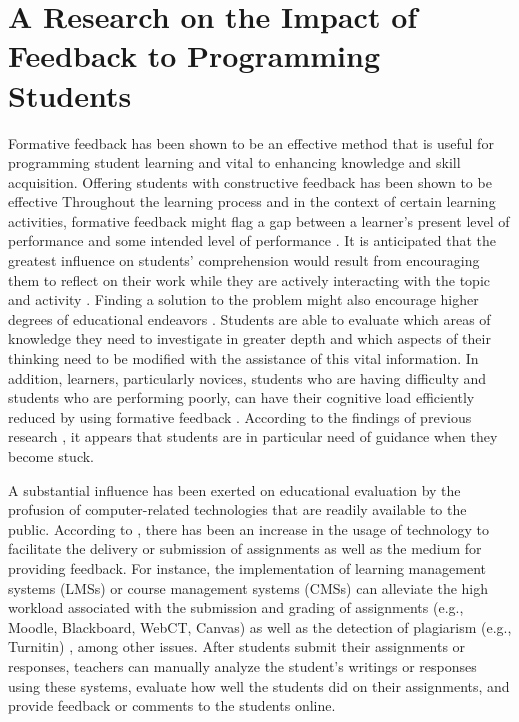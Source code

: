 \section{A Research on the Impact of Feedback to Programming Students} 
Formative feedback has been shown to be an effective method that is useful for programming student learning and vital to enhancing knowledge and skill acquisition. Offering students with constructive feedback has been shown to be effective \cite{ref48} Throughout the learning process and in the context of certain learning activities, formative feedback might flag a gap between a learner's present level of performance and some intended level of performance \cite{ref49}. It is anticipated that the greatest influence on students' comprehension would result from encouraging them to reflect on their work while they are actively interacting with the topic and activity \cite{ref50}. Finding a solution to the problem might also encourage higher degrees of educational endeavors \cite{ref51}. Students are able to evaluate which areas of knowledge they need to investigate in greater depth and which aspects of their thinking need to be modified with the assistance of this vital information. In addition, learners, particularly novices, students who are having difficulty and students who are performing poorly, can have their cognitive load efficiently reduced by using formative feedback \cite{ref52}. According to the findings of previous research \cite{ref53}, it appears that students are in particular need of guidance when they become stuck.\par 
A substantial influence has been exerted on educational evaluation by the profusion of computer-related technologies that are readily available to the public. According to \cite{ref54}, there has been an increase in the usage of technology to facilitate the delivery or submission of assignments as well as the medium for providing feedback. For instance, the implementation of learning management systems (LMSs) or course management systems (CMSs) can alleviate the high workload associated with the submission and grading of assignments (e.g., Moodle, Blackboard, WebCT, Canvas) as well as the detection of plagiarism (e.g., Turnitin) \cite{ref55}, among other issues. After students submit their assignments or responses, teachers can manually analyze the student's writings or responses using these systems, evaluate how well the students did on their assignments, and provide feedback or comments to the students online.\par 
